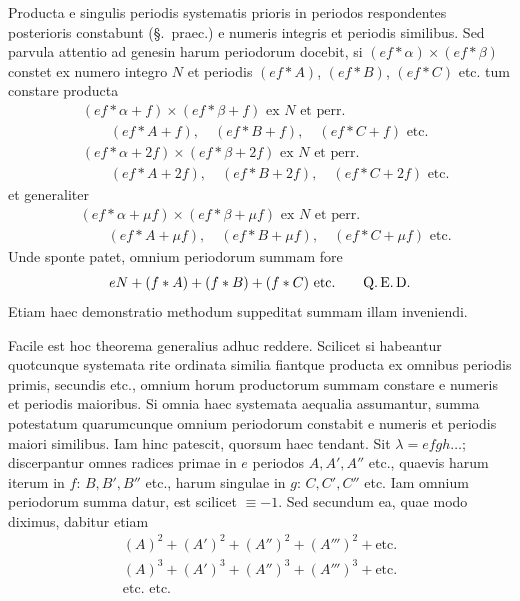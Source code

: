 Producta e singulis periodis systematis prioris in periodos respondentes posterioris constabunt (§.\ praec.) e numeris integris et periodis similibus. Sed parvula attentio ad genesin harum periodorum docebit, si $(ef\ast\alpha)\times(ef\ast\beta)$ constet ex numero integro $N$ et periodis $(ef\ast A)$, $(ef\ast B)$, $(ef\ast C)$ etc. tum constare producta
\[
\begin{aligned}
&(ef\ast\alpha+f)\times(ef\ast\beta+f)\text{ ex }N\text{ et perr.}\\
&\hspace{2em}(ef\ast A+f),\quad(ef\ast B+f),\quad(ef\ast C+f)\text{ etc.}\\
&(ef\ast\alpha+2f)\times(ef\ast\beta+2f)\text{ ex }N\text{ et perr.}\\
&\hspace{2em}(ef\ast A+2f),\quad(ef\ast B+2f),\quad(ef\ast C+2f)\text{ etc.}
\end{aligned}
\]
et generaliter
\[
\begin{aligned}
&(ef\ast\alpha+\mu f)\times(ef\ast\beta+\mu f)\text{ ex }N\text{ et perr.}\\
&\hspace{2em}(ef\ast A+\mu f),\quad(ef\ast B+\mu f),\quad(ef\ast C+\mu f)\text{ etc.}
\end{aligned}
\]
Unde sponte patet, omnium periodorum summam fore
\[
eN+(f\ast A)+(f\ast B)+(f\ast C)\text{ etc.}\qquad\text{Q.\,E.\,D.}
\]
Etiam haec demonstratio methodum suppeditat summam illam inveniendi.

Facile est hoc theorema generalius adhuc reddere. Scilicet si habeantur quotcunque systemata rite ordinata similia fiantque producta ex omnibus periodis primis, secundis etc., omnium horum productorum summam constare e numeris et periodis maioribus. Si omnia haec systemata aequalia assumantur, summa potestatum quarumcunque omnium periodorum constabit e numeris et periodis maiori similibus. Iam hinc patescit, quorsum haec tendant. Sit $\lambda=efgh\ldots$; discerpantur omnes radices primae in $e$ periodos $A,A',A''$ etc., quaevis harum iterum in $f$: $B,B',B''$ etc., harum singulae in $g$: $C,C',C''$ etc. Iam omnium periodorum summa datur, est scilicet $\equiv-1$. Sed secundum ea, quae modo diximus, dabitur etiam
\[
\begin{gathered}
(A)^2+(A')^2+(A'')^2+(A''')^2+\text{etc.}\\
(A)^3+(A')^3+(A'')^3+(A''')^3+\text{etc.}\\
\text{etc. etc.}
\end{gathered}
\]

